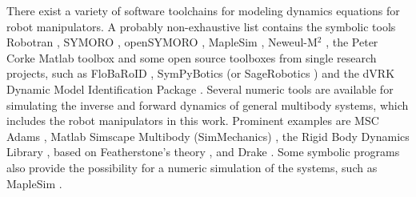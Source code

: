 \documentclass[runningheads]{llncs}
\begin{document}
There exist a variety of software toolchains for modeling dynamics equations for robot manipulators.
A probably non-exhaustive list contains the symbolic tools Robotran \cite{FisettePosSasSam2002,SaminFis2003,Docquier2013}, SYMORO \cite{KhalilCre1997}, openSYMORO \cite{KhalilVijKhoMuk2014}, MapleSim \cite{MapleSim}, Neweul-M$^2$ \cite{KurzEbeHenSch2010}, the Peter Corke Matlab toolbox \cite{Corke2011} and some open source toolboxes from single research projects, such as FloBaRoID \cite{BethgeMalTsaCal2017}, SymPyBotics (or SageRobotics \cite{SousaCor2012}) and the dVRK Dynamic Model Identification Package \cite{WangGonMunFis2019}.
Several numeric tools are available for simulating the inverse and forward dynamics of general multibody systems, which includes the robot manipulators in this work.
Prominent examples are MSC Adams \cite{Adams}, Matlab Simscape Multibody (SimMechanics) \cite{SimMechanics}, the Rigid Body Dynamics Library \cite{RBDL}, based on Featherstone's theory \cite{Featherstone2008}, and Drake \cite{Drake}.
Some symbolic programs also provide the possibility for a numeric simulation of the systems, such as MapleSim \cite{MapleSim}.
\end{document}
